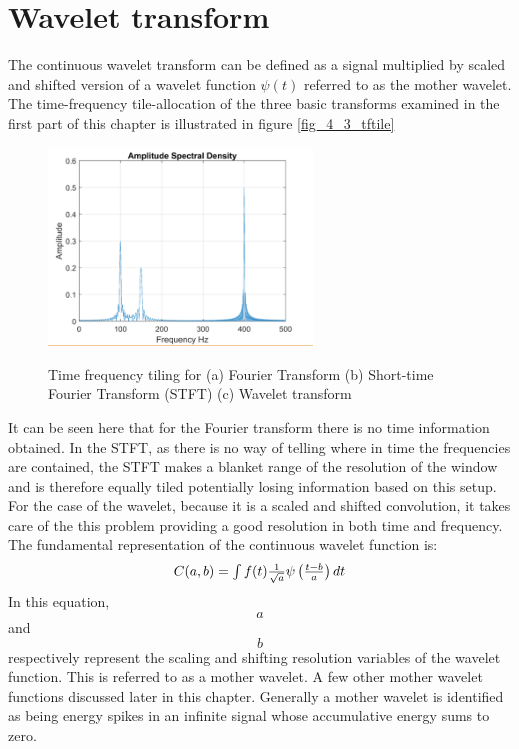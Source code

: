 \section{Wavelet transform}
The continuous wavelet transform can be defined as a signal multiplied by scaled and shifted version of a wavelet function $\psi(t)$ referred to as the mother wavelet. The time-frequency tile-allocation of the three basic transforms examined in the first part of this chapter is illustrated in figure \ref{fig_4_3_tftile}

\begin{figure}
\centering
  \includegraphics[width=7cm]{thesis/images/spectral}\\
  \caption{Time frequency tiling for (a) Fourier Transform (b) Short-time Fourier Transform (STFT) (c) Wavelet transform}\label{fig_4_2_tftile}
\end{figure}

It can be seen here that for the Fourier transform there is no time information obtained.  In the STFT, as there is no way of telling where in time the frequencies are contained, the STFT makes a blanket range of the resolution of the window and is therefore equally tiled potentially losing information based on this setup.  For the case of the wavelet, because it is a scaled and shifted convolution, it takes care of the this problem providing a good resolution in both time and frequency.  The fundamental representation of the continuous wavelet function is:
\begin{equation}
$$C(a,b)=\int f(t)\frac{1}{\sqrt{a}}\psi\left(\frac{t-b}{a}\right)dt$$
\label{eqn_c4_wavelet01}
\end{equation}
In this equation, $$a$$ and $$b$$ respectively represent the scaling and shifting resolution variables of the wavelet function. This is referred to as a mother wavelet. A few other mother wavelet functions discussed later in this chapter. Generally a mother wavelet is identified as being energy spikes in an infinite signal whose accumulative energy sums to zero.

